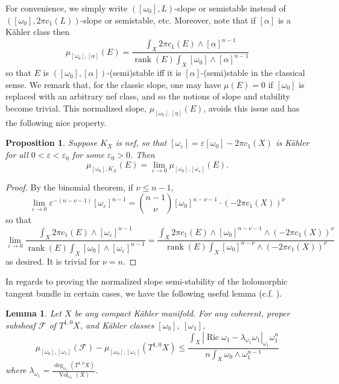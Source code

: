 \documentclass[12pt]{article}
\newtheorem{lemma}[theorem]{Lemma}
\newtheorem{proposition}[theorem]{Proposition}
\numberwithin{equation}{section}
\newcommand{\e}{\varepsilon}
\DeclareMathOperator{\Ric}{Ric}
\DeclareMathOperator{\Vol}{Vol}
\DeclareMathOperator{\rank}{rank}
\begin{document}
\noindent For convenience, we simply write $([\omega_0],L)$-slope or semistable instead of $([\omega_0], 2 \pi c_1(L))$-slope or semistable, etc. Moreover, note that if $[\alpha]$ is a K\"ahler class then 
\begin{equation*}
    \mu_{[\omega_0], [\alpha]}(E) = \frac{\int_X 2 \pi c_1(E) \wedge [\alpha]^{n-1}}{\rank(E) \int_X [\omega_0] \wedge [\alpha]^{n-1}}
\end{equation*}
so that $E$ is $([\omega_0],[\alpha])$-(semi)stable iff it is $[\alpha]$-(semi)stable in the classical sense. We remark that, for the classic slope, one may have $\mu(E) = 0$ if $[\omega_0]$ is replaced with an arbitrary nef class, and so the notions of slope and stability become trivial. This normalized slope, $\mu_{[\omega_0],[\eta]}(E)$, avoids this issue and has the following nice property.

\begin{proposition}
Suppose $K_X$ is nef, so that $[\omega_{\e}] = \e[\omega_0] - 2 \pi c_1(X)$ is K\"ahler for all $0 < \e < \e_0$ for some $\e_0 > 0$. Then
\begin{equation*}
    \mu_{[\omega_0], K_X}(E) = \lim_{\e \to 0} \mu_{[\omega_0], [\omega_\e]}(E).
\end{equation*}
\end{proposition}

\begin{proof}
By the binomial theorem, if $\nu \leq n-1$,
\begin{equation*}
    \lim_{\e \to 0} \e^{-(n-\nu-1)} [\omega_{\e}]^{n-1} = {n-1 \choose \nu} [\omega_0]^{n -\nu - 1} \cdot (-2 \pi c_1(X))^\nu
\end{equation*}
so that
\begin{equation*}
    \lim_{\e \to 0} \frac{\int_X 2 \pi c_1(E) \wedge [\omega_{\e}]^{n-1}}{\rank(E) \int_X [\omega_0] \wedge [\omega_\e]^{n-1}} = \frac{\int_X 2 \pi c_1(E) \wedge [\omega_0]^{n-\nu-1} \wedge (-2 \pi c_1(X))^\nu}{\rank(E)\int_X [\omega_0]^{n-\nu} \wedge (-2 \pi c_1(X))^{\nu}} 
\end{equation*}
as desired. It is trivial for $\nu = n$.
\end{proof}

\noindent In regards to proving the normalized slope semi-stability of the holomorphic tangent bundle in certain cases, we have the following useful lemma (c.f. \cite[Prop. 5.8.2.]{K14}).

\begin{lemma}
Let $X$ be any compact K\"ahler manifold. For any coherent, proper subsheaf $\mathcal{F}$ of $T^{1,0} X$, and K\"ahler classes $[\omega_0]$, $[\omega_1]$,
\begin{equation*}
    \mu_{[\omega_0], [\omega_1]}(\mathcal{F}) - \mu_{[\omega_0], [\omega_1]}(T^{1,0} X) \leq  \frac{\int_X |\Ric \omega_1 - \lambda_{\omega_1} \omega_1|_{\omega_1} \omega_1^n}{n\int_X \omega_0 \wedge \omega_1^{n-1}}
\end{equation*}
where $\lambda_{\omega_1} = \frac{\deg_{\omega_1} (T^{1,0} X)}{\Vol_{\omega_1}(X)}$.
\end{lemma}
\end{document}
